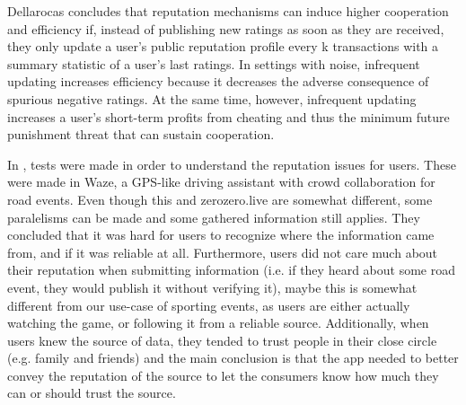 Dellarocas \cite{Dellarocas2006-update-freq} concludes that reputation mechanisms can induce higher cooperation and efficiency if, instead of publishing new ratings as soon as they are received, they only update a user's public reputation profile every k transactions with a summary statistic of a user's last ratings. In settings with noise, infrequent updating increases efficiency because it decreases the adverse consequence of spurious negative ratings. At the same time, however, infrequent updating increases a user's short-term profits from cheating and thus the minimum future punishment threat that can sustain cooperation.

In \cite{Afonso2016}, tests were made in order to understand the reputation issues for users. These were made in Waze, a GPS-like driving assistant with crowd collaboration for road events. Even though this and zerozero.live are somewhat different, some paralelisms can be made and some gathered information still applies. They concluded that it was hard for users to recognize where the information came from, and if it was reliable at all. Furthermore, users did not care much about their reputation when submitting information (i.e. if they heard about some road event, they would publish it without verifying it), maybe this is somewhat different from our use-case of sporting events, as users are either actually watching the game, or following it from a reliable source. Additionally, when users knew the source of data, they tended to trust people in their close circle (e.g. family and friends) and the main conclusion is that the app needed to better convey the reputation of the source to let the consumers know how much they can or should trust the source.

